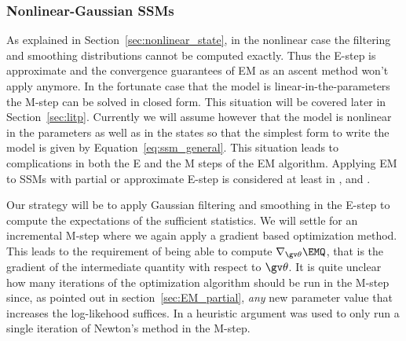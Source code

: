 \subsubsection{Nonlinear-Gaussian SSMs} \label{sec:EM_nonlinear}%

As explained in Section~\ref{sec:nonlinear_state}, in the nonlinear case
the filtering and smoothing distributions cannot be computed exactly.
Thus the E-step is approximate and the convergence
guarantees of EM as an ascent method won't apply anymore. In the fortunate case that the
model is linear-in-the-parameters the M-step can be solved in closed form.
This situation will be covered later in Section~\ref{sec:litp}. 
Currently we will assume however that the model is nonlinear in the 
parameters as well as in the states so that the simplest form to write the 
model is given by Equation~\eqref{eq:ssm_general}. This situation leads to 
complications in both the E and the M steps of the EM algorithm.
Applying EM to SSMs with partial or approximate E-step is considered
at least in \textcite{Schon2011,Ratna2008,Doucet2001,Roweis2001},  and \textcite{Goodwin2005}.

Our strategy will be to apply Gaussian filtering and smoothing
in the E-step to compute the expectations of the sufficient statistics.
We will settle for an incremental M-step where we again apply a gradient based optimization method.
This leads to the requirement of being able to compute 
$\nabla_{\Th}\EMQ$, that is the gradient of the intermediate quantity with respect
to $\Th$. It is quite unclear how many iterations of the optimization algorithm should
be run in the M-step since, as pointed out in section~\ref{sec:EM_partial},
\emph{any} new parameter value that increases the log-likehood suffices. In \textcite{Lange1995}
a heuristic argument was used to only run a single iteration of Newton's method in the M-step.

